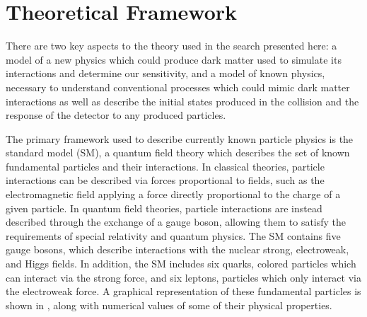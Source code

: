 \chapter{Theoretical Framework}
\label{theory}
There are two key aspects to the theory used in the search presented here: a model of a new physics which could produce dark matter used to simulate its interactions and determine our sensitivity, and a model of known physics, necessary to understand conventional processes which could mimic dark matter interactions as well as describe the initial states produced in the collision and the response of the detector to any produced particles.

The primary framework used to describe currently known particle physics is the standard model (SM), a quantum field theory which describes the set of known fundamental particles and their interactions.
In classical theories, particle interactions can be described via forces proportional to fields, such as the electromagnetic field applying a force directly proportional to the charge of a given particle.
In quantum field theories, particle interactions are instead described through the exchange of a gauge boson, allowing them to satisfy the requirements of special relativity and quantum physics. 
The SM contains five gauge bosons, which describe interactions with the nuclear strong, electroweak, and Higgs fields.
In addition, the SM includes six quarks, colored particles which can interact via the strong force, and six leptons, particles which only interact via the electroweak force.
A graphical representation of these fundamental particles is shown in , along with numerical values of some of their physical properties.

